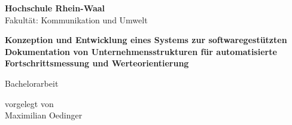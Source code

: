 \begin{titlepage}
    \begin{center}
        \vspace{0.5cm}
        \Large{
            \textbf{Hochschule Rhein-Waal}\\
            Fakultät: Kommunikation und Umwelt
        }

        \vspace{3cm}
        \vfill
        \LARGE{
            \textbf{Konzeption und Entwicklung eines Systems zur softwaregestützten Dokumentation von Unternehmensstrukturen für automatisierte Fortschrittsmessung und Werteorientierung 
        }}
        \vfill

        \vspace{1.5cm}
        \LARGE{Bachelorarbeit}
        
        \vfill

        \vspace{1cm}
        \large{vorgelegt von \\}
        \LARGE{Maximilian Oedinger}
    \end{center}
\end{titlepage}